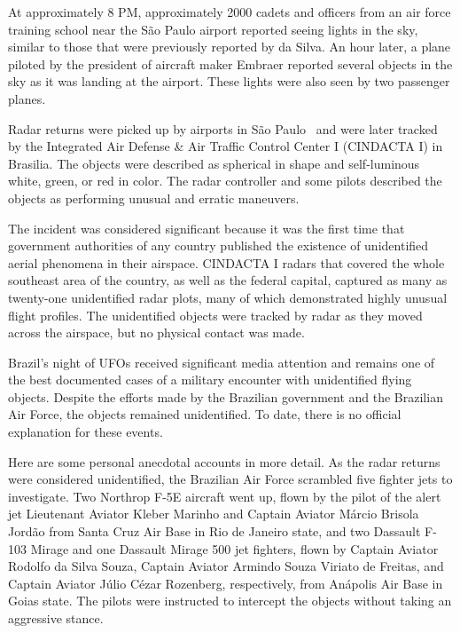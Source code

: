 At approximately 8 PM, approximately 2000 cadets and officers from an air force training school near the S\~ao Paulo airport reported seeing
lights in the sky, similar to those that were previously reported by da Silva.
An hour later, a plane piloted by the president of aircraft maker Embraer reported several objects in the sky as it was landing at the airport.
These lights were also seen by two passenger planes.

Radar returns were picked up by airports in S\~ao Paulo~\cite{Brazil86} and were later tracked by the Integrated Air Defense {\&} Air Traffic Control Center I (CINDACTA I) in Brasilia. The objects were described as spherical in shape and self-luminous white, green, or red in color. The radar controller and some pilots described the objects as performing unusual and erratic maneuvers.

The incident was considered significant because it was the first time that government authorities of any country published the existence of unidentified aerial phenomena in their airspace. CINDACTA I radars that covered the whole southeast area of the country, as well as the federal capital, captured as many as twenty-one unidentified radar plots, many of which demonstrated highly unusual flight profiles. The unidentified objects were tracked by radar as they moved across the airspace, but no physical contact was made.

Brazil's night of UFOs received significant media attention and remains one of the best documented cases of a military encounter with unidentified flying objects. Despite the efforts made by the Brazilian government and the Brazilian Air Force, the objects remained unidentified. To date, there is no official explanation for these events.

Here are some personal anecdotal accounts in more detail. As the radar returns were considered unidentified, the Brazilian Air Force scrambled five fighter jets to investigate. Two Northrop F-5E aircraft went up, flown by the pilot of the alert jet Lieutenant Aviator Kleber Marinho and Captain Aviator M\'arcio Brisola Jord\~ao from Santa Cruz Air Base in Rio de Janeiro state, and two Dassault F-103 Mirage and one Dassault Mirage 500 jet fighters, flown by Captain Aviator Rodolfo da Silva Souza, Captain Aviator Armindo Souza Viriato de Freitas, and Captain Aviator J\'ulio C\'ezar Rozenberg,
respectively, from An\'apolis Air Base in Goias state.
The pilots were instructed to intercept the objects without taking an aggressive stance.


